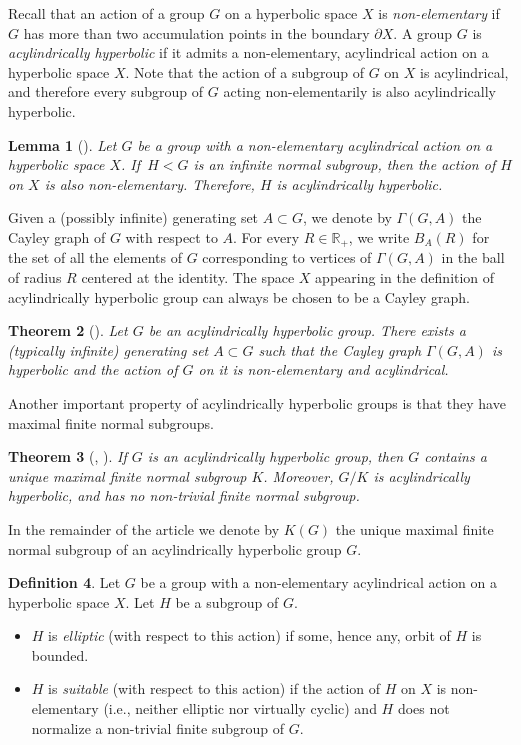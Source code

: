 \documentclass[JEP,XML,SOM,Unicode]{cedram}
\newtheorem{theorem}{Theorem}[section]
\newtheorem{lemma}[theorem]{Lemma}
\theoremstyle{definition}
\newtheorem{definition}[theorem]{Definition}
\begin{document}
Recall that an action of a group $G$ on a hyperbolic space $X$ is \emph{non-elementary} if~$G$ has more than two accumulation points in the boundary $\partial X$.
A group $G$ is \emph{acylindrically hyperbolic} if it admits a non-elementary, acylindrical action on a hyperbolic space $X$.
Note that the action of a subgroup of $G$ on $X$ is acylindrical, and therefore every subgroup of $G$ acting non-elementarily is also acylindrically hyperbolic.

\begin{lemma}[{\cite[Lem.\,7.2]{osin}}]
\label{lem:normal}
Let $G$ be a group with a non-elementary acylindrical action on a hyperbolic space $X$. If~$H < G$ is an infinite normal subgroup, then the action of $H$ on $X$ is also non-elementary. Therefore, $H$ is acylindrically hyperbolic.
\end{lemma}

Given a (possibly infinite) generating set $A \subset G$, we denote by $\Gamma(G,A)$ the Cayley graph of $G$ with respect to $A$.
For every $R \in \mathbb R_+$, we write $B_A(R)$ for the set of all the elements of $G$ corresponding to vertices of $\Gamma(G,A)$ in the ball of radius $R$ centered at the identity.
The space $X$ appearing in the definition of acylindrically hyperbolic group can always be chosen to be a Cayley graph.

\begin{theorem}[{\cite[Th.\,1.2]{osin}}]
\label{thm:cayley}
Let $G$ be an acylindrically hyperbolic group.
There exists a (typically infinite) generating set $A \subset G$ such that the Cayley graph $\Gamma(G, A)$ is hyperbolic and the action of $G$ on it is non-elementary and acylindrical.
\end{theorem}

Another important property of acylindrically hyperbolic groups is that they have maximal finite normal subgroups.

\begin{theorem}[{\cite[Th.\,2.23]{DGO}, \cite[Lem.\,5.10]{hull}}]
\label{thm:K}
If $G$ is an acylindrically hyperbolic group, then $G$ contains a unique maximal finite normal subgroup $K$.
Moreover, $G/K$ is acylindrically hyperbolic, and has no non-trivial finite normal subgroup.
\end{theorem}

In the remainder of the article we denote by $K(G)$ the unique maximal finite normal subgroup of an acylindrically hyperbolic group $G$.

\begin{definition}
Let $G$ be a group with a non-elementary acylindrical action on a hyperbolic space $X$.
Let $H$ be a subgroup of $G$.
\begin{itemize}
\item $H$ is \emph{elliptic} (with respect to this action) if some, hence any, orbit of $H$ is bounded.
\item $H$ is \emph{suitable} (with respect to this action) if the action of $H$ on $X$ is non-elementary (i.e., neither elliptic nor virtually cyclic) and $H$ does not normalize a non-trivial finite subgroup of $G$.
\end{itemize}
\end{definition}
\end{document}
